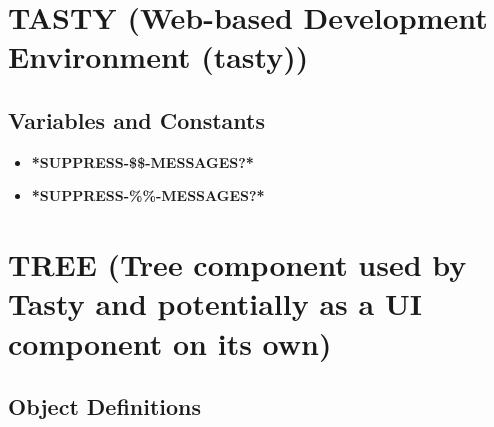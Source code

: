 \documentclass [11pt]{book}
\begin{document}
\label{sec:surf(nurbssurfaceandsolidsgeometryprimitives)}







\section{TASTY (Web-based Development Environment (tasty))}

\label{sec:tasty(web-baseddevelopmentenvironment(tasty))}





\subsection{Variables and Constants}

\label{subsec:variablesandconstants}



\begin{itemize}

\item {}
\label{prim:*suppress-\$\$-messages?*}
\textbf{*SUPPRESS-\$\$-MESSAGES?*}





\item {}
\label{prim:*suppress-\%\%-messages?*}
\textbf{*SUPPRESS-\%\%-MESSAGES?*}





\end{itemize}





\section{TREE (Tree component used by Tasty and potentially as a UI component on its own)}

\label{sec:tree(treecomponentusedbytastyandpotentiallyasauicomponentonitsown)}





\subsection{Object Definitions}

\label{subsec:objectdefinitions}
\end{document}
